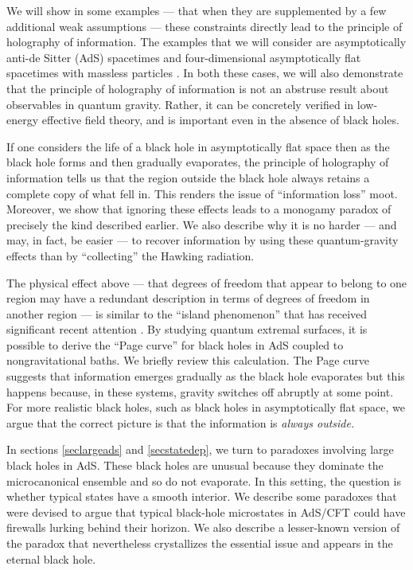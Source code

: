 \documentclass[12pt]{article}
\begin{document}
We will show in some examples --- that when they are supplemented by a few additional weak assumptions --- these constraints directly lead to the principle of holography of information. The examples that we will consider are asymptotically anti-de Sitter (AdS) spacetimes  and four-dimensional asymptotically flat spacetimes with massless particles \cite{Laddha:2020kvp}. In both these cases, we will also demonstrate that the principle of holography of information is not an abstruse result about observables in quantum gravity.  Rather, it can be concretely verified in low-energy effective field theory, and is important even in the absence of black holes.


If one considers the life of a black hole in asymptotically flat space then as the black hole forms and then gradually evaporates, the principle of holography of information tells us that the region outside the black hole always retains a complete copy of what fell in. This renders the issue of ``information loss'' moot. Moreover, we show that ignoring these effects leads to a monogamy paradox of precisely the kind described earlier. We also describe why it is no harder --- and may, in fact, be easier --- to recover information by using these quantum-gravity effects than by ``collecting'' the Hawking radiation.

The physical effect above --- that degrees of freedom that appear to belong to one region may have a redundant description in terms of degrees of freedom in another region --- is similar to the ``island phenomenon'' that has received significant recent attention \cite{Penington:2019npb,Penington:2019kki,Almheiri:2019yqk,Almheiri:2019qdq}.  By studying quantum extremal surfaces, it is possible to derive the ``Page curve'' \cite{Page:1993df,lubkin1978entropy} for black holes in AdS  coupled to nongravitational baths. We briefly review this calculation. The Page curve suggests that information emerges gradually as the black hole evaporates but this happens because, in these systems, gravity switches off abruptly at some point. For more realistic black holes, such as black holes in asymptotically flat space, we argue that the correct picture is that the information is {\em always outside.}

In sections \ref{seclargeads} and \ref{secstatedep}, we turn to paradoxes involving large black holes in AdS. These black holes are unusual because they dominate the microcanonical ensemble and so do not evaporate. In this setting, the question is whether typical states have a smooth interior. We describe some paradoxes \cite{Almheiri:2013hfa,Marolf:2013dba} that were devised to argue  that typical black-hole microstates in AdS/CFT \cite{Maldacena:1997re,Gubser:1998bc,Witten:1998qj} could have firewalls lurking behind their horizon. We also describe a lesser-known version of the paradox that nevertheless crystallizes the essential issue and appears in the eternal black hole.
\end{document}
